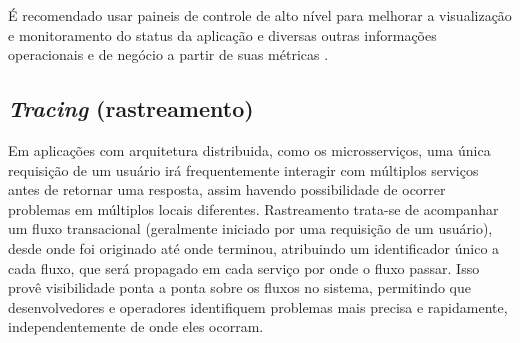 É recomendado usar paineis de controle de alto nível para melhorar a visualização e monitoramento do status da aplicação e diversas outras informações operacionais e de negócio a partir de suas métricas \cite{martin-fowler-microservices}.

\subsection{\emph{Tracing} (rastreamento)}
Em aplicações com arquitetura distribuida, como os microsserviços, uma única requisição de um usuário irá frequentemente interagir com múltiplos serviços antes de retornar uma resposta, assim havendo possibilidade de ocorrer problemas em múltiplos locais diferentes. Rastreamento trata-se de acompanhar um fluxo transacional (geralmente iniciado por uma requisição de um usuário), desde onde foi originado até onde terminou, atribuindo um identificador único a cada fluxo, que será propagado em cada serviço por onde o fluxo passar. Isso provê visibilidade ponta a ponta sobre os fluxos no sistema, permitindo que desenvolvedores e operadores identifiquem problemas mais precisa e rapidamente, independentemente de onde eles ocorram. 









